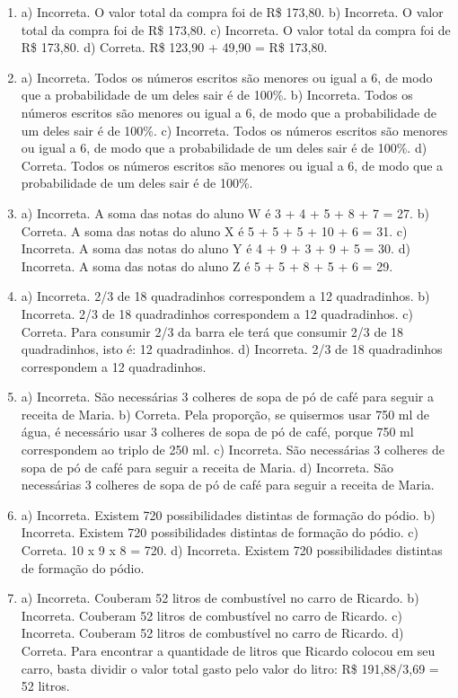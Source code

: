 \begin{enumerate}
\item
a) Incorreta. O valor total da compra foi de R\$ 173,80.
b) Incorreta. O valor total da compra foi de R\$ 173,80.
c) Incorreta. O valor total da compra foi de R\$ 173,80.
d) Correta. R\$ 123,90 + 49,90 = R\$ 173,80.

\item
a) Incorreta. Todos os números escritos são menores ou igual a 6, de modo
que a probabilidade de um deles sair é de 100\%.
b) Incorreta. Todos os números escritos são menores ou igual a 6, de modo
que a probabilidade de um deles sair é de 100\%.
c) Incorreta. Todos os números escritos são menores ou igual a 6, de modo
que a probabilidade de um deles sair é de 100\%.
d) Correta. Todos os números escritos são menores ou igual a 6, de modo
que a probabilidade de um deles sair é de 100\%.

\item
a) Incorreta. A soma das notas do aluno W é 3 + 4 + 5 + 8 + 7 = 27.
b) Correta. A soma das notas do aluno X é 5 + 5 + 5 + 10 + 6 = 31.
c) Incorreta. A soma das notas do aluno Y é 4 + 9 + 3 + 9 + 5 = 30.
d) Incorreta. A soma das notas do aluno Z é 5 + 5 + 8 + 5 + 6 = 29.

\item
a) Incorreta. 2/3 de 18 quadradinhos correspondem a 12 quadradinhos. 
b) Incorreta. 2/3 de 18 quadradinhos correspondem a 12 quadradinhos.
c) Correta. Para consumir 2/3 da barra ele terá que consumir 2/3 de 18
quadradinhos, isto é: 12 quadradinhos.
d) Incorreta. 2/3 de 18 quadradinhos correspondem a 12 quadradinhos.

\item
a) Incorreta. São necessárias 3 colheres de sopa de pó de café para
seguir a receita de Maria.
b) Correta. Pela proporção, se quisermos usar 750 ml de água, é
necessário usar 3 colheres de sopa de pó de café, porque 750 ml 
correspondem ao triplo de 250 ml. 
c) Incorreta. São necessárias 3 colheres de sopa de pó de café para
seguir a receita de Maria.
d) Incorreta. São necessárias 3 colheres de sopa de pó de café para
seguir a receita de Maria.

\item
a) Incorreta. Existem 720 possibilidades distintas de formação do pódio.
b) Incorreta. Existem 720 possibilidades distintas de formação do pódio.
c) Correta. 10 x 9 x 8 = 720.
d) Incorreta. Existem 720 possibilidades distintas de formação do pódio.

\item
a) Incorreta. Couberam 52 litros de combustível no carro de Ricardo.
b) Incorreta. Couberam 52 litros de combustível no carro de Ricardo.
c) Incorreta. Couberam 52 litros de combustível no carro de Ricardo. 
d) Correta. Para encontrar a quantidade de litros que Ricardo colocou 
em seu carro, basta dividir o valor total gasto pelo valor do litro:
R\$ 191,88/3,69 = 52 litros.


\end{enumerate}

